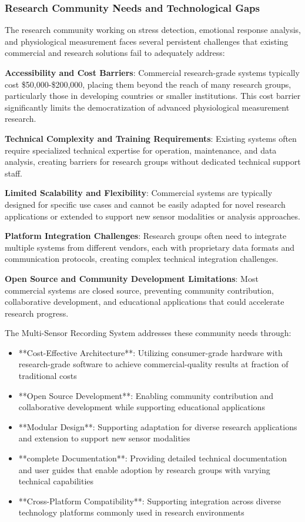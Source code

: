 \documentclass[11pt,a4paper]{article}
\begin{document}
\subsubsection{Research Community Needs and Technological Gaps}

The research community working on stress detection, emotional response analysis, and
physiological measurement faces
several persistent challenges that existing commercial and research solutions fail to
adequately address:

\textbf{Accessibility and Cost Barriers}: Commercial research-grade systems typically cost \$50,000-\$200,000, placing them
beyond the reach of many research groups, particularly those in developing countries
or smaller institutions.  This cost
barrier significantly limits the democratization of advanced physiological
measurement research.

\textbf{Technical Complexity and Training Requirements}: Existing systems often require specialized technical expertise for
operation, maintenance, and data analysis, creating barriers for research groups
without dedicated technical support
staff.

\textbf{Limited Scalability and Flexibility}: Commercial systems are typically designed for specific use cases and cannot be
easily adapted for novel research applications or extended to support new sensor
modalities or analysis approaches.

\textbf{Platform Integration Challenges}: Research groups often need to integrate multiple systems from different vendors,
each with proprietary data formats and communication protocols, creating complex
technical integration challenges.

\textbf{Open Source and Community Development Limitations}: Most commercial systems are closed source, preventing community
contribution, collaborative development, and educational applications that could
accelerate research progress.

The Multi-Sensor Recording System addresses these community needs through:

\begin{itemize}
\item **Cost-Effective Architecture**: Utilizing consumer-grade hardware with research-grade software to achieve
  commercial-quality results at fraction of traditional costs
\item **Open Source Development**: Enabling community contribution and collaborative development while supporting
  educational applications
\item **Modular Design**: Supporting adaptation for diverse research applications and extension to support new sensor
  modalities
\item **complete Documentation**: Providing detailed technical documentation and user guides that enable adoption by
  research groups with varying technical capabilities
\item **Cross-Platform Compatibility**: Supporting integration across diverse technology platforms commonly used in research
  environments

\end{itemize}
\end{document}
